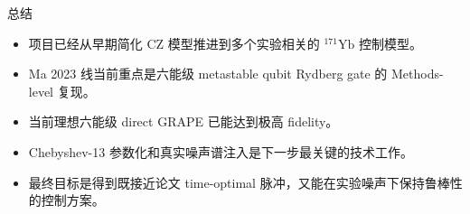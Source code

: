 \documentclass[aspectratio=169,11pt]{ctexbeamer}
\begin{document}
\begin{frame}{总结}
  \begin{itemize}
    \item 项目已经从早期简化 CZ 模型推进到多个实验相关的 \({}^{171}\mathrm{Yb}\) 控制模型。
    \item Ma 2023 线当前重点是六能级 metastable qubit Rydberg gate 的 Methods-level 复现。
    \item 当前理想六能级 direct GRAPE 已能达到极高 fidelity。
    \item Chebyshev-13 参数化和真实噪声谱注入是下一步最关键的技术工作。
    \item 最终目标是得到既接近论文 time-optimal 脉冲，又能在实验噪声下保持鲁棒性的控制方案。
  \end{itemize}
\end{frame}
\end{document}
